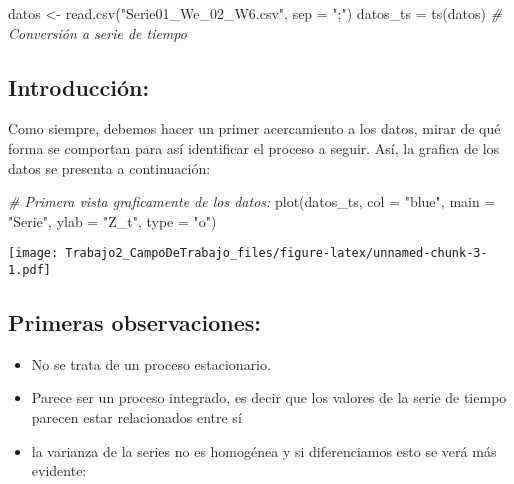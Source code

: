 \documentclass[
]{article}
\newenvironment{Shaded}{\begin{snugshade}}{\end{snugshade}}
\newcommand{\AttributeTok}[1]{\textcolor[rgb]{0.77,0.63,0.00}{#1}}
\newcommand{\CommentTok}[1]{\textcolor[rgb]{0.56,0.35,0.01}{\textit{#1}}}
\newcommand{\FunctionTok}[1]{\textcolor[rgb]{0.00,0.00,0.00}{#1}}
\newcommand{\NormalTok}[1]{#1}
\newcommand{\OtherTok}[1]{\textcolor[rgb]{0.56,0.35,0.01}{#1}}
\newcommand{\StringTok}[1]{\textcolor[rgb]{0.31,0.60,0.02}{#1}}
\begin{document}
\begin{Shaded}
\begin{Highlighting}[]
\NormalTok{datos }\OtherTok{\textless{}{-}} \FunctionTok{read.csv}\NormalTok{(}\StringTok{"Serie01\_We\_02\_W6.csv"}\NormalTok{, }\AttributeTok{sep =} \StringTok{";"}\NormalTok{)}
\NormalTok{datos\_ts }\OtherTok{=} \FunctionTok{ts}\NormalTok{(datos) }\CommentTok{\# Conversión a serie de tiempo}
\end{Highlighting}
\end{Shaded}

\hypertarget{introducciuxf3n}{%
\subsection{Introducción:}\label{introducciuxf3n}}

Como siempre, debemos hacer un primer acercamiento a los datos, mirar de
qué forma se comportan para así identificar el proceso a seguir. Así, la
grafica de los datos se presenta a continuación:

\begin{Shaded}
\begin{Highlighting}[]
\CommentTok{\# Primera vista graficamente de los datos: }
\FunctionTok{plot}\NormalTok{(datos\_ts, }\AttributeTok{col =} \StringTok{"blue"}\NormalTok{, }\AttributeTok{main =} \StringTok{"Serie"}\NormalTok{, }\AttributeTok{ylab =} \StringTok{"Z\_t"}\NormalTok{, }\AttributeTok{type =} \StringTok{"o"}\NormalTok{)}
\end{Highlighting}
\end{Shaded}

\texttt{[image: Trabajo2\_CampoDeTrabajo\_files/figure-latex/unnamed-chunk-3-1.pdf]}

\hypertarget{primeras-observaciones}{%
\subsection{Primeras observaciones:}\label{primeras-observaciones}}

\begin{itemize}
\item
  No se trata de un proceso estacionario.
\item
  Parece ser un proceso integrado, es decir que los valores de la serie
  de tiempo parecen estar relacionados entre sí
\item
  la varianza de la series no es homogénea y si diferenciamos esto se
  verá más evidente:
\end{itemize}
\end{document}
